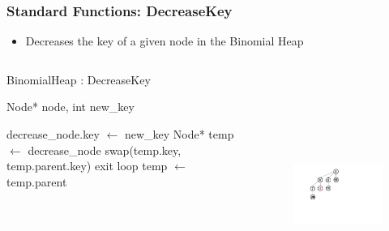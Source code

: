 \documentclass[13pt]{beamer}
\begin{document}
\begin{frame}
\frametitle{Standard Functions: DecreaseKey}
  \begin{itemize}
    \item Decreases the key of a given node in the Binomial Heap
  \end{itemize}

  \begin{columns}[T] %
    \begin{column}[T]{6cm} %
        \begin{algorithm}[H]
        \small
        \caption{BinomialHeap : DecreaseKey}
        \begin{algorithmic}
          \REQUIRE Node* node, int new\_key

          \STATE decrease\_node.key $\leftarrow$ new\_key
          \STATE Node* temp $\leftarrow$ decrease\_node
                \STATE swap(temp.key, temp.parent.key)
              \ELSE
                \STATE exit loop
              \ENDIF
              \STATE temp $\leftarrow$ temp.parent
          \ENDWHILE
        \end{algorithmic}
        \end{algorithm}
    \end{column}
    \begin{column}[T]{7.5cm} %
      \begin{figure}
        \includegraphics[height=8cm]{./img/decreasekeyB.png}
      \end{figure}
    \end{column}
  \end{columns}

\end{frame}
\end{document}
